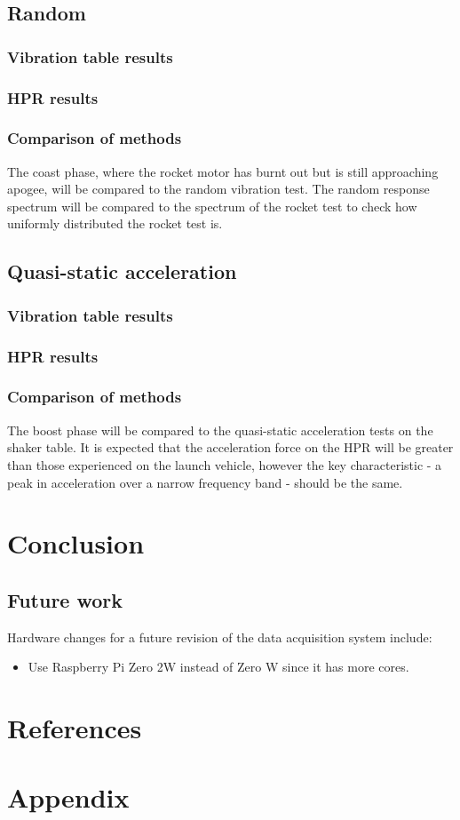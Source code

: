 \documentclass[a4paper,11pt]{article}
\begin{document}
\subsection{Random}
\subsubsection{Vibration table results}
\subsubsection{HPR results}
\subsubsection{Comparison of methods}
The coast phase, where the rocket motor has burnt out but is still approaching apogee, will be compared to the random vibration test. The random response spectrum will be compared to the spectrum of the rocket test to check how uniformly distributed the rocket test is.

\subsection{Quasi-static acceleration}
\subsubsection{Vibration table results}
\subsubsection{HPR results}
\subsubsection{Comparison of methods}
The boost phase will be compared to the quasi-static acceleration tests on the shaker table. It is expected that the acceleration force on the HPR will be greater than those experienced on the launch vehicle, however the key characteristic - a peak in acceleration over a narrow frequency band - should be the same.

\section{Conclusion}
\subsection{Future work}

Hardware changes for a future revision of the data acquisition system include:

\begin{itemize}
  \item Use Raspberry Pi Zero 2W instead of Zero W since it has more cores.
\end{itemize}

\section{References}

\printbibliography[heading=none]

\section{Appendix}
\end{document}
